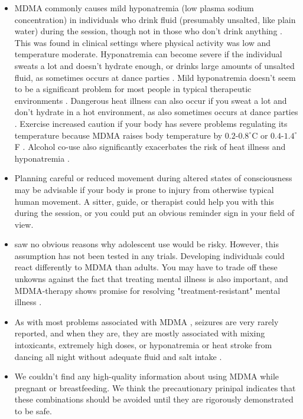 \documentclass[12pt,letterpaper]{book}
\begin{document}
\begin{itemize}
    \item MDMA commonly causes mild hyponatremia (low plasma sodium concentration) in individuals who drink fluid (presumably unsalted, like plain water) during the session, though not in those who don't drink anything \cite{atilaHyponatremia}. This was found in clinical settings where physical activity was low and temperature moderate. Hyponatremia can become severe if the individual sweats a lot and doesn't hydrate enough, or drinks large amounts of unsalted fluid, as sometimes occurs at dance parties \cite{vanOverheatingAlcohol}. Mild hyponatremia doesn't seem to be a significant problem for most people in typical therapeutic environments \cite{mitchellMDMAClinicalTrial}. Dangerous heat illness can also occur if you sweat a lot and don't hydrate in a hot environment, as also sometimes occurs at dance parties \cite{vanOverheatingAlcohol}. Exercise increased caution if your body has severe problems regulating its temperature because MDMA raises body temperature by $0.2$-$0.8^{\circ}$C or $0.4$-$1.4^{\circ}$F \cite{liechti2014effects}. Alcohol co-use also significantly exacerbates the risk of heat illness and hyponatremia \cite{vanOverheatingAlcohol}.
    \item Planning careful or reduced movement during altered states of consciousness may be advisable if your body is prone to injury from otherwise typical human movement. A sitter, guide, or therapist could help you with this during the session, or you could put an obvious reminder sign in your field of view.
    \item \textcite{kangaslampiAdolescent} saw no obvious reasons why adolescent use would be risky. However, this assumption has not been tested in any trials. Developing individuals could react differently to MDMA than adults. You may have to trade off these unkowns against the fact that treating mental illness is also important, and MDMA-therapy shows promise for resolving "treatment-resistant" mental illness \cite{mitchellMDMAClinicalTrial}.
    \item As with most problems associated with MDMA \cite{riggDeaths}, seizures are very rarely reported, and when they are, they are mostly associated with mixing intoxicants, extremely high doses, or hyponatremia or heat stroke from dancing all night without adequate fluid and salt intake \cite{freidelSeizures}.
    \item We couldn't find any high-quality information about using MDMA while pregnant or breastfeeding. We think the precautionary prinipal indicates that these combinations should be avoided until they are rigorously demonstrated to be safe.
\end{itemize}
\end{document}
